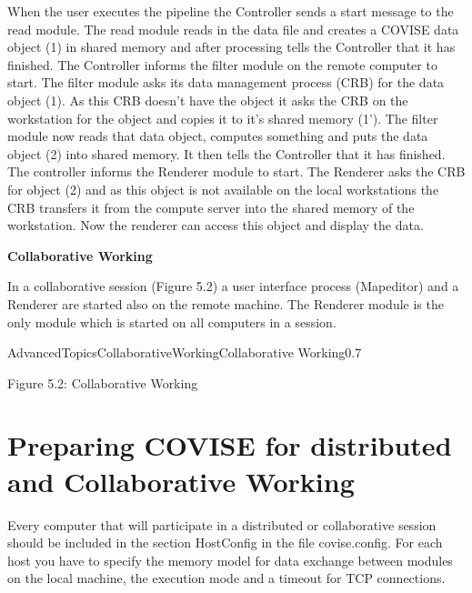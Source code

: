 When the user executes the pipeline the Controller sends a start message to the read 
module. The read module reads in the data file and creates a COVISE data object (1) in 
shared memory and after processing tells the Controller that it has finished. The 
Controller informs the filter module on the remote computer to start. The filter 
module asks its data management process (CRB) for the data object (1). As this CRB 
doesn't have the object it asks the CRB on the workstation for the object and copies 
it to it's shared memory (1'). The filter module now reads that data object,
computes something and puts the data object (2) into shared memory. It then tells 
the Controller that it has finished. The controller informs the Renderer module to start.
The Renderer asks the CRB for object (2) and as this object is not
available on the local workstations the CRB transfers it from the compute server into the shared memory of the
workstation. Now the renderer can access this object and display the data. 

\vspace{0.5cm}
\begin{Large}{\bf Collaborative Working}\end{Large}
\vspace{0.5cm}

In a collaborative session (Figure 5.2) a user interface process (Mapeditor) 
and a Renderer are started also on the remote machine. The Renderer module is the 
only module which is started on all computers in a session. 


\begin{covimg}{AdvancedTopics}{CollaborativeWorking}{Collaborative Working}{0.7}\end{covimg}
\begin{htmlonly}
Figure 5.2: Collaborative Working
\vspace{1cm}
\end{htmlonly}

\clearpage
\section{Preparing COVISE for distributed and Collaborative Working}


Every computer that will participate in a distributed or collaborative session should be included in the section
HostConfig in the file covise.config. For each host you have to specify the memory model for data exchange between
modules on the local machine, the execution mode and a timeout for TCP connections. 

